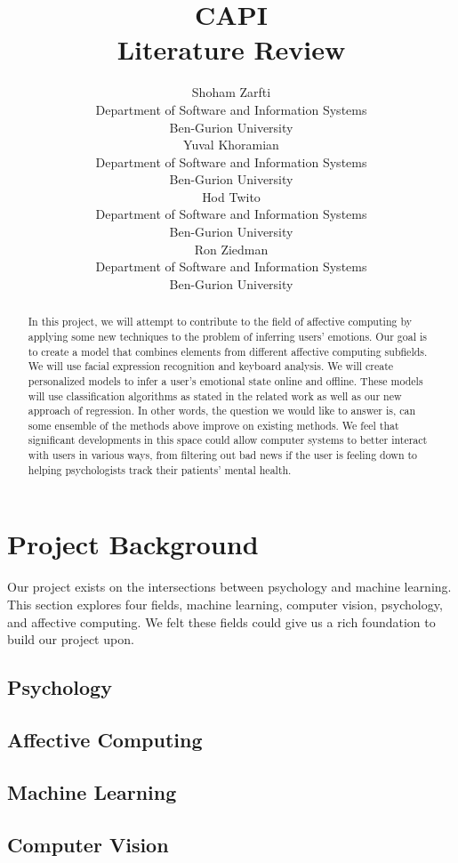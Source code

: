 \documentclass{article}
\title{CAPI \\ Literature Review}
\author{
  Shoham Zarfti \\
  Department of Software and Information Systems \\
  Ben-Gurion University \\
   \And
 Yuval Khoramian \\
  Department of Software and Information Systems\\
  Ben-Gurion University \\
  \And
 Hod Twito \\
  Department of Software and Information Systems\\
  Ben-Gurion University \\
  \And
 Ron Ziedman \\
  Department of Software and Information Systems\\
  Ben-Gurion University \\
}
\begin{document}
\maketitle
\begin{abstract}
  In this project, we will attempt to contribute to the field of affective computing by applying some new techniques to the problem of inferring users'
  emotions. Our goal is to create a model that combines elements from different affective computing subfields.
  We will use facial expression recognition and keyboard analysis. We will create personalized models to infer a user's emotional state online
  and offline. These models will use classification algorithms as stated in the related work as well as our new approach of regression. In other words,
  the question we would like to answer is, can some ensemble of the methods above improve on existing methods. We feel that significant
  developments in this space could allow computer systems to better interact with users in various ways, from filtering out bad news if the user
  is feeling down to helping psychologists track their patients' mental health.
\end{abstract}


\section{Project Background}
Our project exists on the intersections between psychology and machine learning.
This section explores four fields, machine learning, computer vision, psychology, and affective computing.
We felt these fields could give us a rich foundation to build our project upon.


\subsection{Psychology}


\subsection{Affective Computing}


\subsection{Machine Learning}


\subsection{Computer Vision}  \label{section:cv}

\end{document}

